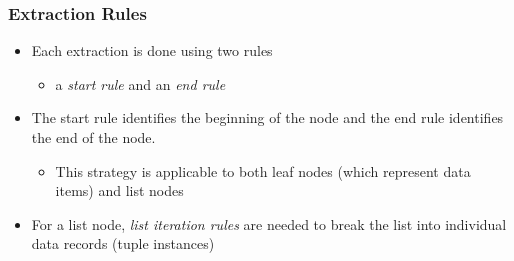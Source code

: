 \documentclass[svgnames]{beamer}
\begin{document}


  


\begin{frame} \frametitle{Extraction Rules}
  
  \begin{itemize}
  \item Each extraction is done using two rules
    \begin{itemize}
    \item a \emph{start rule} and an \emph{end rule}
    \end{itemize}
  \item The start rule identifies the beginning of the node and the end rule
    identifies the end of the node.
    \begin{itemize}
    \item This strategy is applicable to both leaf nodes (which represent data
      items) and list nodes
    \end{itemize}
  \item For a list node, \emph{list iteration rules} are needed to break the
    list into individual data records (tuple instances)
  \end{itemize}

\end{frame}
\end{document}
